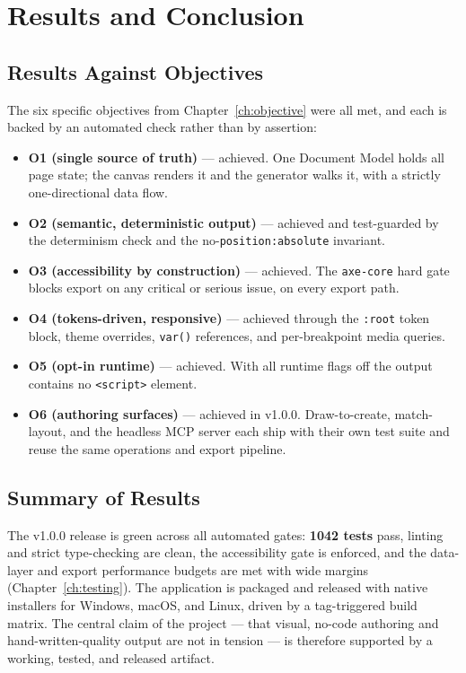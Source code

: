 
\chapter{Results and Conclusion}
\label{ch:results}

\section{Results Against Objectives}
The six specific objectives from Chapter~\ref{ch:objective} were all met, and each
is backed by an automated check rather than by assertion:

\begin{itemize}[leftmargin=1.5em]
  \item \textbf{O1 (single source of truth)} --- achieved. One Document Model holds
        all page state; the canvas renders it and the generator walks it, with a
        strictly one-directional data flow.
  \item \textbf{O2 (semantic, deterministic output)} --- achieved and test-guarded
        by the determinism check and the no-\texttt{position:absolute} invariant.
  \item \textbf{O3 (accessibility by construction)} --- achieved. The
        \texttt{axe-core} hard gate blocks export on any critical or serious issue,
        on every export path.
  \item \textbf{O4 (tokens-driven, responsive)} --- achieved through the
        \texttt{:root} token block, theme overrides, \texttt{var()} references, and
        per-breakpoint media queries.
  \item \textbf{O5 (opt-in runtime)} --- achieved. With all runtime flags off the
        output contains no \texttt{<script>} element.
  \item \textbf{O6 (authoring surfaces)} --- achieved in v1.0.0. Draw-to-create,
        match-layout, and the headless MCP server each ship with their own test
        suite and reuse the same operations and export pipeline.
\end{itemize}

\section{Summary of Results}
The v1.0.0 release is green across all automated gates: \textbf{1042 tests} pass,
linting and strict type-checking are clean, the accessibility gate is enforced, and
the data-layer and export performance budgets are met with wide margins
(Chapter~\ref{ch:testing}). The application is packaged and released with native
installers for Windows, macOS, and Linux, driven by a tag-triggered build matrix.
The central claim of the project --- that visual, no-code authoring and
hand-written-quality output are not in tension --- is therefore supported by a
working, tested, and released artifact.

